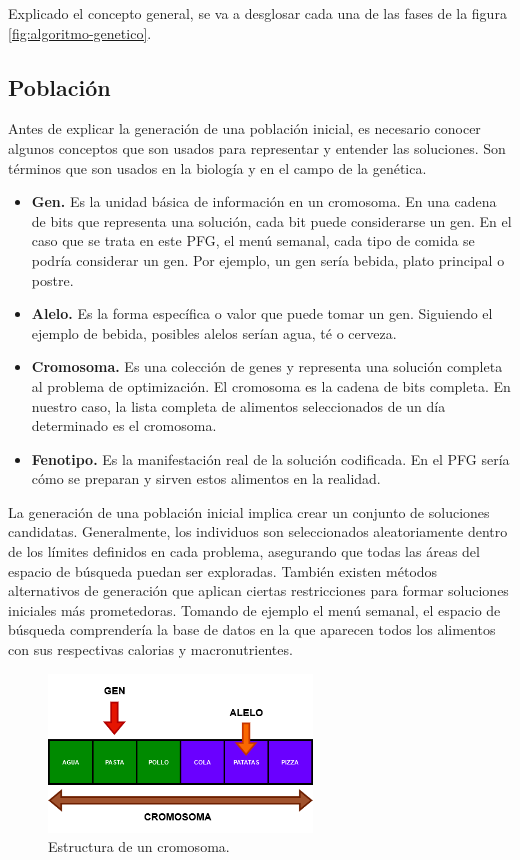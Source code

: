 Explicado el concepto general, se va a desglosar cada una de las fases de la figura \ref{fig:algoritmo-genetico}.

\subsection{Población}

Antes de explicar la generación de una población inicial, es necesario conocer algunos conceptos que son usados para representar y entender las soluciones. Son términos que son usados en la biología y en el campo de la genética. 

\begin{itemize}
    \item \textbf{Gen.} Es la unidad básica de información en un cromosoma. En una cadena de bits que representa una solución, cada bit puede considerarse un gen. En el caso que se trata en este PFG, el menú semanal, cada tipo de comida se podría considerar un gen. Por ejemplo, un gen sería bebida, plato principal o postre.
    \item \textbf{Alelo.} Es la forma específica o valor que puede tomar un gen. Siguiendo el ejemplo de bebida, posibles alelos serían agua, té o cerveza.
    \item \textbf{Cromosoma.} Es una colección de genes y representa una solución completa al problema de optimización. El cromosoma es la cadena de bits completa. En nuestro caso, la lista completa de alimentos seleccionados de un día determinado es el cromosoma. 
    \item \textbf{Fenotipo.} Es la manifestación real de la solución codificada. En el PFG sería cómo se preparan y sirven estos alimentos en la realidad.
\end{itemize}

La generación de una población inicial implica crear un conjunto de soluciones candidatas. Generalmente, los individuos son seleccionados aleatoriamente dentro de los límites definidos en cada problema, asegurando que todas las áreas del espacio de búsqueda puedan ser exploradas. También existen métodos alternativos de generación que aplican ciertas restricciones para formar soluciones iniciales más prometedoras. Tomando de ejemplo el menú semanal, el espacio de búsqueda comprendería la base de datos en la que aparecen todos los alimentos con sus respectivas calorias y macronutrientes. 

\begin{figure}[H]
  \centering
  \includegraphics[width=0.625\textwidth]{figures/cromosoma.png}
  \caption{Estructura de un cromosoma.}
  \label{fig:cromosoma}
\end{figure}



